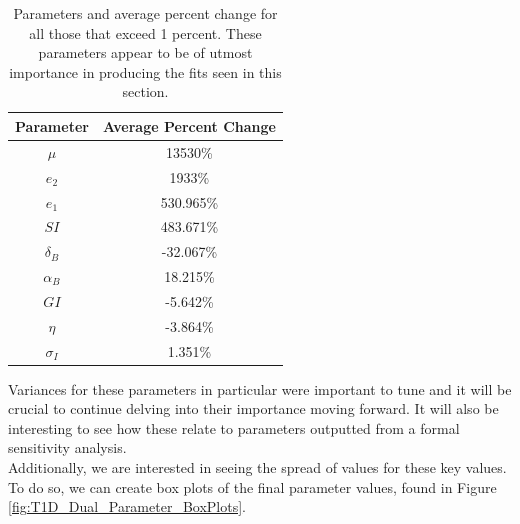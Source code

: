 \begin{table}[H]
  \begin{center}
 
    \begin{tabular}{c|c} %
      \textbf{Parameter} & \textbf{Average Percent Change} \\
      \hline
      \textbf{$\mu$} & 13530\%\\
      \textbf{$e_2$} & 1933\%\\
      \textbf{$e_1$} & 530.965\%\\
      \textbf{$SI$} & 483.671\%\\
      \textbf{$\delta_B$} & -32.067\%\\
      \textbf{$\alpha_B$} & 18.215\%\\
      \textbf{$GI$} & -5.642\%\\
      \textbf{$\eta$} & -3.864\%\\
      \textbf{$\sigma_I$} & 1.351\%
    \end{tabular}
    \caption{Parameters and average percent change for all those that exceed 1 percent. These parameters appear to be of utmost importance in producing the fits seen in this section.}
    \label{table:T1D_Dual_ParamChange}
  \end{center}
\end{table}

Variances for these parameters in particular were important to tune and it will be crucial to continue delving into their importance moving forward. It will also be interesting to see how these relate to parameters outputted from a formal sensitivity analysis.\\

Additionally, we are interested in seeing the spread of values for these key values. To do so, we can create box plots of the final parameter values, found in Figure \ref{fig:T1D_Dual_Parameter_BoxPlots}.

